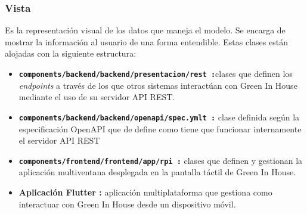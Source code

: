         \subsubsection{Vista}
        Es la representación visual de los datos que maneja el modelo. Se encarga de mostrar la información al usuario de una forma entendible. Estas clases están alojadas con la siguiente estructura:
        \begin{itemize}
            \item \textbf{\texttt{components/backend/backend/presentacion/rest :}}clases que definen los \textit{endpoints} a través de los que otros sistemas interactúan con Green In House mediante el uso de su servidor API REST.
            \item \textbf{\texttt{components/backend/backend/openapi/spec.ymlt :}} clase definida según la especificación OpenAPI que de define como tiene que funcionar internamente el servidor API REST 
            \item \textbf{\texttt{components/frontend/frontend/app/rpi :}} clases que definen y gestionan la aplicación multiventana desplegada en la pantalla táctil de Green In House.
            \item \textbf{Aplicación Flutter :} aplicación multiplataforma que gestiona como interactuar con Green In House desde un dispositivo móvil.
        \end{itemize}
        
